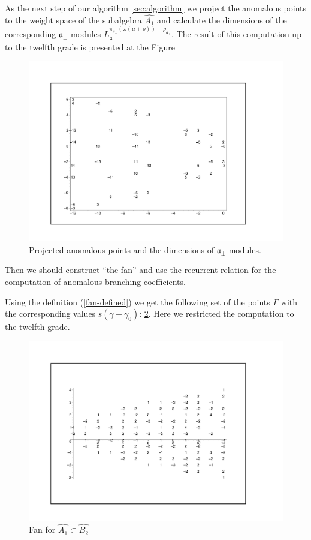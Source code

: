 \documentclass[a4paper,12pt]{article}
\theoremstyle{definition} \newtheorem{Def}{Definition}
\begin{document}
As the next step of our algorithm \ref{sec:algorithm} we project the anomalous points to the weight space of the subalgebra $\hat{A_1}$ and calculate the dimensions of the corresponding $\mathfrak{a}_{\bot}$-modules $L^{\pi_{\mathfrak{a}_{\bot}}(\omega(\mu+\rho))-\rho_{\mathfrak{a}_{\bot}}}_{\mathfrak{a}_{\bot}}$.
The result of this computation up to the twelfth grade is presented at the Figure
\begin{figure}[h!tb]
  \centering
  \includegraphics[width=150mm]{AffineB2_A1_proj_anom.pdf}
  \caption{Projected anomalous points and the dimensions of $\mathfrak{a}_{\bot}$-modules.}
  \label{fig:AffineB2_A1_anom_proj}
\end{figure}

Then we should construct ``the fan'' and use the recurrent relation for the computation of anomalous branching coefficients.

Using the definition (\ref{fan-defined}) we get the following set of
the points $\Gamma$ with the corresponding values $s(\gamma+\gamma_0)$: \ref{fig:AffineB2A1Fan}.
Here we restricted the computation to the twelfth grade.
\begin{figure}[ph]
  \centering
  \includegraphics[width=130mm]{AffineB2_A1_fan.pdf}
  \caption{Fan for $\hat{A_1}\subset \hat{B_2}$}
  \label{fig:AffineB2A1Fan}
\end{figure}
\end{document}
